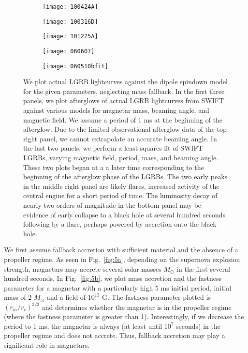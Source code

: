 \documentclass{article}
\begin{document}
\begin{figure}[h!]
\centering
\begin{subfigure}{.5\textwidth}
    \centering
    \texttt{[image: 100424A]}
    \caption{}
    \label{fig:3a}
\end{subfigure}%
\begin{subfigure}{.5\textwidth}
    \centering
    \texttt{[image: 100316D]}
    \caption{}
    \label{fig:3b}
\end{subfigure}
\begin{subfigure}{.5\textwidth}
    \centering
    \texttt{[image: 101225A]}
    \caption{}
    \label{fig:3c}
\end{subfigure}%
\begin{subfigure}{.5\textwidth}
    \centering
    \texttt{[image: 060607]}
    \caption{}
    \label{fig:3d}
\end{subfigure}
\begin{subfigure}{.5\textwidth}
    \centering
    \texttt{[image: 060510bfit]}
    \caption{}
    \label{fig:3e}
\end{subfigure}
\caption{We plot actual LGRB lightcurves against the dipole spindown model for the given parameters, neglecting mass fallback. In the first three panels, we plot afterglows of actual LGRB lightcurves from SWIFT against various models for magnetar mass, beaming angle, and magnetic field. We assume a period of 1 ms at the beginning of the afterglow. Due to the limited observational afterglow data of the top right panel, we cannot extrapolate an accurate beaming angle. In the last two panels, we perform a least squares fit of SWIFT LGRBs, varying magnetic field, period, mass, and beaming angle. These two plots began at a a later time corresponding to the beginning of the afterglow phase of the LGRBs. The two early peaks in the middle right panel are likely flares, increased activity of the central engine for a short period of time. The luminosity decay of nearly two orders of magnitude in the bottom panel  may be evidence of early collapse to a black hole at several hundred seconds following by a flare, perhaps powered by accretion onto the black hole.}
\label{fig:3}
\end{figure}

We first assume fallback accretion with sufficient material and the absence of a propeller regime. As seen in Fig.~\ref{fig:5a}, depending on the supernova explosion strength,  magnetars may accrete several solar masses $M_{\odot}$ in the first several hundred seconds. In Fig.~\ref{fig:5b}, we plot mass accretion and the fastness parameter for a magnetar with a particularly high 5 ms initial period, initial mass of 2 $M_{\odot}$ and a field of $10^{15}$ G. The fastness parameter plotted is $(r_m/r_c)^{3/2}$ and determines whether the magnetar is in the propeller regime (where the fastness parameter is greater than 1). Interestingly, if we decrease the period to 1 ms, the magnetar is always (at least until $10^7$ seconds) in the propeller regime and does not accrete. Thus, fallback accretion may play a significant role in  magnetars.
\end{document}
